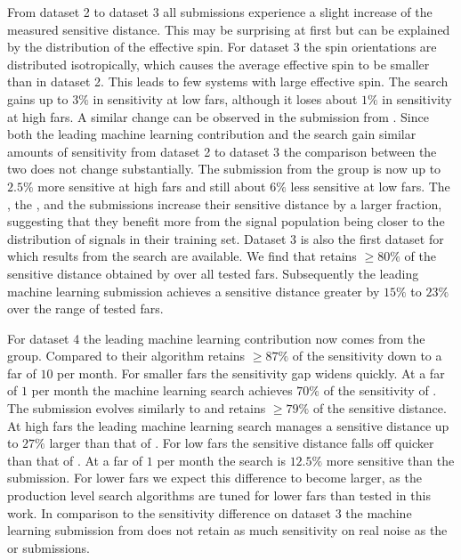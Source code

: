 From dataset 2 to dataset 3 all submissions experience a slight increase of the measured sensitive distance. This may be surprising at first but can be explained by the distribution of the effective spin. For dataset 3 the spin orientations are distributed isotropically, which causes the average effective spin to be smaller than in dataset 2. This leads to few systems with large effective spin. The \pycbc search gains up to $3\%$ in sensitivity at low \acrshort{far}s, although it loses about $1\%$ in sensitivity at high \acrshort{far}s. A similar change can be observed in the submission from \jena. Since both the leading machine learning contribution and the \pycbc search gain similar amounts of sensitivity from dataset 2 to dataset 3 the comparison between the two does not change substantially. The submission from the \jena group is now up to $2.5\%$ more sensitive at high \acrshort{far}s and still about $6\%$ less sensitive at low \acrshort{far}s. The \virgo, the \mfcnn, and the \cnn submissions increase their sensitive distance by a larger fraction, suggesting that they benefit more from the signal population being closer to the distribution of signals in their training set. Dataset 3 is also the first dataset for which results from the \cwb search are available. We find that \cwb retains $\geq 80\%$ of the sensitive distance obtained by \pycbc over all tested \acrshort{far}s. Subsequently the leading machine learning submission achieves a sensitive distance greater by $15\%$ to $23\%$ over the range of tested \acrshort{far}s.

For dataset 4 the leading machine learning contribution now comes from the \virgo group. Compared to \pycbc their algorithm retains $\geq 87\%$ of the sensitivity down to a \acrshort{far} of $10$ per month. For smaller \acrshort{far}s the sensitivity gap widens quickly. At a \acrshort{far} of $1$ per month the machine learning search achieves $70\%$ of the sensitivity of \pycbc. The \cwb submission evolves similarly to \pycbc and retains $\geq 79\%$ of the sensitive distance. At high \acrshort{far}s the leading machine learning search manages a sensitive distance up to $27\%$ larger than that of \cwb. For low \acrshort{far}s the sensitive distance falls off quicker than that of \cwb. At a \acrshort{far} of $1$ per month the \cwb search is $12.5\%$ more sensitive than the \virgo submission. For lower \acrshort{far}s we expect this difference to become larger, as the production level search algorithms are tuned for lower \acrshort{far}s than tested in this work. In comparison to the sensitivity difference on dataset 3 the machine learning submission from \virgo does not retain as much sensitivity on real noise as the \pycbc or \cwb submissions.

